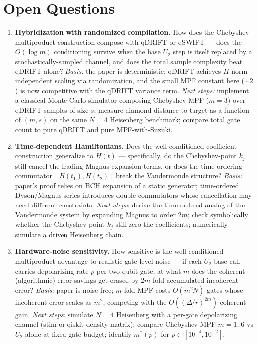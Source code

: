 \section{Open Questions}

\begin{enumerate}
  \item \textbf{Hybridization with randomized compilation.} How does the Chebyshev-multiproduct construction compose with qDRIFT or qSWIFT --- does the $O(\log m)$ conditioning survive when the base $U_2$ step is itself replaced by a stochastically-sampled channel, and does the total sample complexity beat qDRIFT alone? \emph{Basis:} the paper is deterministic; qDRIFT achieves $H$-norm-independent scaling via randomization, and the small MPF constant here ($\sim 2$) is now competitive with the qDRIFT variance term. \emph{Next steps:} implement a classical Monte-Carlo simulator composing Chebyshev-MPF ($m=3$) over qDRIFT samples of size $s$; measure diamond-distance-to-target as a function of $(m,s)$ on the same $N=4$ Heisenberg benchmark; compare total gate count to pure qDRIFT and pure MPF-with-Suzuki.
  \item \textbf{Time-dependent Hamiltonians.} Does the well-conditioned coefficient construction generalize to $H(t)$ --- specifically, do the Chebyshev-point $k_j$ still cancel the leading Magnus-expansion terms, or does the time-ordering commutator $[H(t_1),H(t_2)]$ break the Vandermonde structure? \emph{Basis:} paper's proof relies on BCH expansion of a static generator; time-ordered Dyson/Magnus series introduces double-commutators whose cancellation may need different constraints. \emph{Next steps:} derive the time-ordered analog of the Vandermonde system by expanding Magnus to order $2m$; check symbolically whether the Chebyshev-point $k_j$ still zero the coefficients; numerically simulate a driven Heisenberg chain.
  \item \textbf{Hardware-noise sensitivity.} How sensitive is the well-conditioned multiproduct advantage to realistic gate-level noise --- if each $U_2$ base call carries depolarizing rate $p$ per two-qubit gate, at what $m$ does the coherent (algorithmic) error savings get erased by $2m$-fold accumulated incoherent error? \emph{Basis:} paper is noise-free; $m$-fold MPF costs $O(m^2 N)$ gates whose incoherent error scales as $m^2$, competing with the $O((\Delta/r)^{2m})$ coherent gain. \emph{Next steps:} simulate $N=4$ Heisenberg with a per-gate depolarizing channel (stim or qiskit density-matrix); compare Chebyshev-MPF $m=1..6$ vs $U_2$ alone at fixed gate budget; identify $m^*(p)$ for $p \in [10^{-4},10^{-2}]$.

\end{enumerate}
